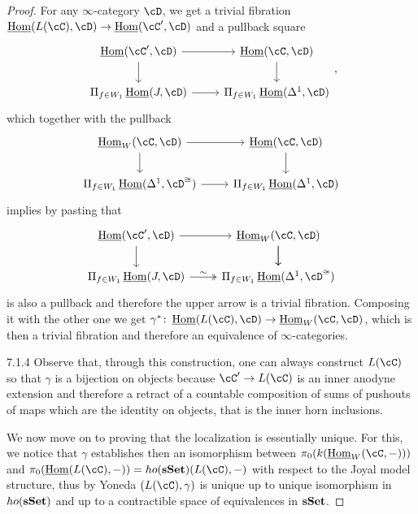 \begin{proof}
  For any $\infty$-category $\cD$, we get a trivial fibration
  $\home(L(\cC),\cD)\rightarrow\home(\cC',\cD)$ and a pullback square
  \[\begin{tikzcd}
    {\home(\cC',\cD)} & {\home(\cC,\cD)} \\
    {\Pi_{f\in W_1}\home(J,\cD)} & {\Pi_{f\in W_1}\home(\Delta^1,\cD)}
    \arrow[from=1-2, to=2-2]
    \arrow[from=2-1, to=2-2]
    \arrow[from=1-1, to=2-1]
    \arrow[from=1-1, to=1-2]
  \end{tikzcd},\]
  which together with the pullback
  \[\begin{tikzcd}
    {\home_W(\cC,\cD)} & {\home(\cC,\cD)} \\
    {\Pi_{f\in W_1}\home(\Delta^1,\cD^{\cong})} & {\Pi_{f\in W_1}\home(\Delta^1,\cD)}
    \arrow[from=1-2, to=2-2]
    \arrow[from=2-1, to=2-2]
    \arrow[from=1-1, to=2-1]
    \arrow[from=1-1, to=1-2]
  \end{tikzcd}\]
  implies by pasting that
  \[\begin{tikzcd}
    {\home(\cC',\cD)} & {\home_W(\cC,\cD)} \\
    {\Pi_{f\in W_1}\home(J,\cD)} & {\Pi_{f\in W_1}\home(\Delta^1,\cD^{\cong})}
    \arrow[from=1-2, to=2-2]
    \arrow[from=1-1, to=1-2]
    \arrow[from=1-1, to=2-1]
    \arrow["\sim", two heads, from=2-1, to=2-2]
    \arrow[from=1-2, to=2-2]
  \end{tikzcd}\]
  is also a pullback and therefore the upper arrow is a trivial fibration.
  Composing it with the other one we get
  $\gamma^*\colon\home(L(\cC),\cD)\rightarrow\home_W(\cC,\cD)$, which is then a
  trivial fibration and therefore an equivalence of $\infty$-categories.

  7.1.4 Observe that, through this construction, one can always construct
  $L(\cC)$ so that $\gamma$ is a bijection on objects because $\cC'\rightarrow
  L(\cC)$ is an inner anodyne extension and therefore a retract of a countable
  composition of sums of pushouts of maps which are the identity on objects,
  that is the inner horn inclusions.

  We now move on to proving that the localization is essentially unique. For
  this, we notice that $\gamma$ establishes then an isomorphism between
  $\pi_0(k(\home_W(\cC,-)))$ and $\pi_0(\home(L(\cC),-))=ho(\sSet)(L(\cC),-)$
  with respect to the Joyal model structure, thus by Yoneda $(L(\cC),\gamma)$ is
  unique up to unique isomorphism in $ho(\operatorname{\mathbf{sSet}})$ and up to a contractible space
  of equivalences in $\operatorname{\mathbf{sSet}}$.
\end{proof}

